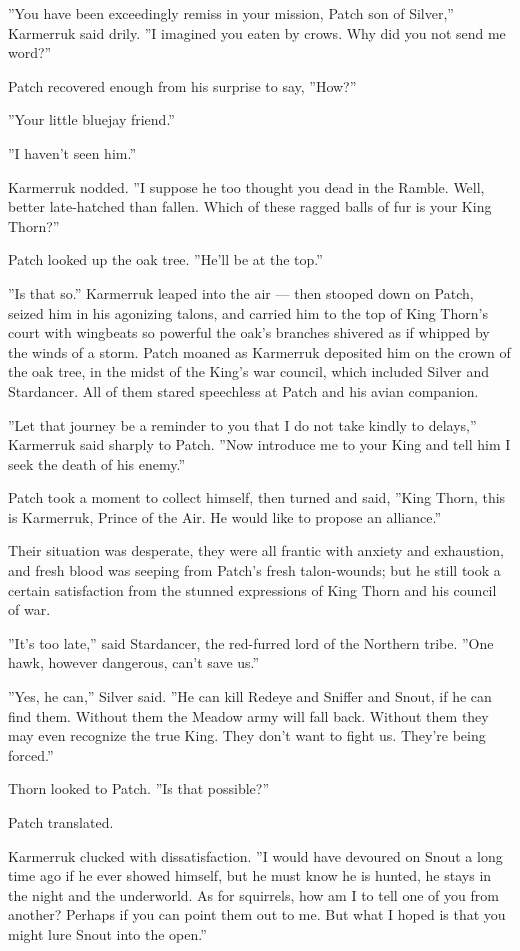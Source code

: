 \documentclass[12pt]{book}
\begin{document}
''You have been exceedingly remiss in your mission, Patch son of
Silver,'' Karmerruk said drily. ''I imagined you eaten by crows. Why
did you not send me word?''

Patch recovered enough from his surprise to say, ''How?''

''Your little bluejay friend.''

''I haven't seen him.''

Karmerruk nodded. ''I suppose he too thought you dead in the
Ramble. Well, better late-hatched than fallen. Which of these ragged
balls of fur is your King Thorn?''

Patch looked up the oak tree. ''He'll be at the top.''

''Is that so.'' Karmerruk leaped into the air --- then stooped down on
Patch, seized him in his agonizing talons, and carried him to the top
of King Thorn's court with wingbeats so powerful the oak's branches
shivered as if whipped by the winds of a storm. Patch moaned as
Karmerruk deposited him on the crown of the oak tree, in the midst of
the King's war council, which included Silver and Stardancer. All of
them stared speechless at Patch and his avian companion.

''Let that journey be a reminder to you that I do not take kindly to
delays,'' Karmerruk said sharply to Patch. ''Now introduce me to your
King and tell him I seek the death of his enemy.''

Patch took a moment to collect himself, then turned and said, ''King
Thorn, this is Karmerruk, Prince of the Air. He would like to propose
an alliance.''

Their situation was desperate, they were all frantic with anxiety and
exhaustion, and fresh blood was seeping from Patch's fresh
talon-wounds; but he still took a certain satisfaction from the
stunned expressions of King Thorn and his council of war.

''It's too late,'' said Stardancer, the red-furred lord of the
Northern tribe. ''One hawk, however dangerous, can't save us.''

''Yes, he can,'' Silver said. ''He can kill Redeye and Sniffer and
Snout, if he can find them. Without them the Meadow army will fall
back. Without them they may even recognize the true King. They don't
want to fight us. They're being forced.''

Thorn looked to Patch. ''Is that possible?''

Patch translated.

Karmerruk clucked with dissatisfaction. ''I would have devoured on
Snout a long time ago if he ever showed himself, but he must know he
is hunted, he stays in the night and the underworld. As for squirrels,
how am I to tell one of you from another? Perhaps if you can point
them out to me. But what I hoped is that you might lure Snout into the
open.''
\end{document}
